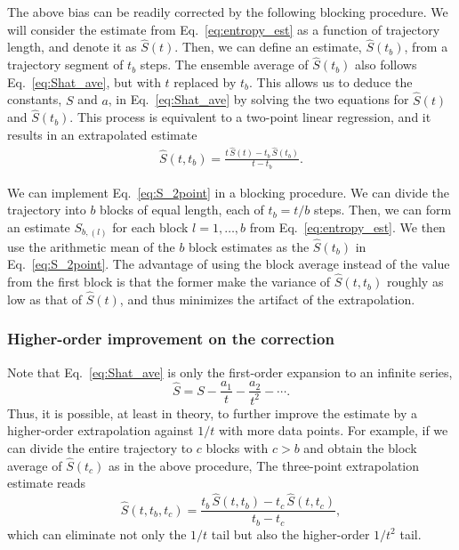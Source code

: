 \documentclass[reprint, superscriptaddress]{revtex4-1}
\begin{document}
The above bias can be readily corrected by the following blocking procedure.
%
We will consider the estimate from Eq.~\eqref{eq:entropy_est}
as a function of trajectory length, and denote it as $\hat S(t)$.
%
Then, we can define an estimate, $\hat S(t_b)$,
from a trajectory segment of $t_b$ steps.
%
The ensemble average of $\hat S(t_b)$ also follows
Eq.~\eqref{eq:Shat_ave}, but with $t$ replaced by $t_b$.
%
This allows us to deduce the constants, $S$ and $a$, in Eq.~\eqref{eq:Shat_ave}
by solving the two equations for $\hat S(t)$ and $\hat S(t_b)$.
%
This process is equivalent to a two-point linear regression,
and it results in an extrapolated estimate
%
\begin{align}
    \hat S(t, t_b)
    =
    \frac{ t \, \hat S(t) - t_b \, \hat S(t_b) }
         { t - t_b }
    .
    \label{eq:S_2point}
\end{align}

We can implement Eq.~\eqref{eq:S_2point} in a blocking procedure.
%
We can divide the trajectory into $b$ blocks of equal length,
each of $t_b = t/b$ steps.
%
Then, we can form an estimate $S_{b, (l)}$ for each block $l = 1, \dots, b$ from Eq.~\eqref{eq:entropy_est}.
%
We then use the arithmetic mean of the $b$ block estimates
as the $\hat S(t_b)$ in Eq.~\eqref{eq:S_2point}.
%
The advantage of using the block average instead of
the value from the first block is that
the former make the variance of $\hat S(t, t_b)$
roughly as low as that of $\hat S(t)$,
and thus minimizes the artifact of the extrapolation.


\subsubsection{Higher-order improvement on the correction}

Note that Eq.~\eqref{eq:Shat_ave} is only the first-order expansion
to an infinite series,
%
\begin{equation}
  \hat S = S - \frac{a_1}{t} - \frac{a_2}{t^2} - \cdots
  .
  \label{eq:S_series_invt}
\end{equation}
%
Thus, it is possible, at least in theory,
to further improve the estimate by a higher-order extrapolation
against $1/t$ with more data points.
%
For example, if we can divide the entire trajectory to $c$ blocks
with $c > b$ and obtain the block average of $\hat S(t_c)$
as in the above procedure,
%
The three-point extrapolation estimate reads
$$
\hat S(t, t_b, t_c) =
\frac{ t_b \, \hat S(t, t_b) - t_c \, \hat S(t, t_c) }
     { t_b - t_c },
$$
which can eliminate not only the $1/t$ tail
but also the higher-order $1/t^2$ tail.
\end{document}
